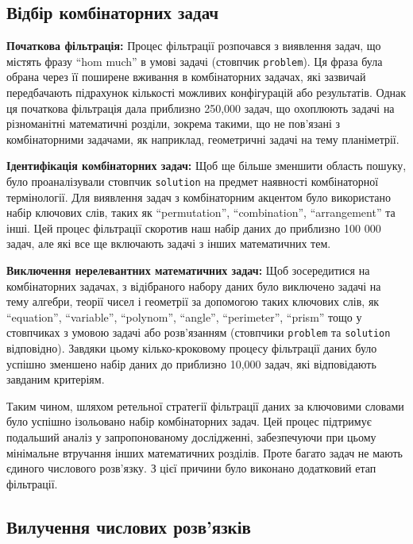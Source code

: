 \subsection{Відбір комбінаторних задач}

\textbf{Початкова фільтрація:} Процес фільтрації розпочався з виявлення задач, що містять фразу ``hom much'' в умові задачі (стовпчик \texttt{problem}). Ця фраза була обрана через її поширене вживання в комбінаторних задачах, які зазвичай передбачають підрахунок кількості можливих конфігурацій або результатів. Однак ця початкова фільтрація дала приблизно 250,000 задач, що охоплюють задачі на різноманітні математичні розділи, зокрема такими, що не пов'язані з комбінаторними задачами, як наприклад, геометричні задачі на тему планіметрії.

\textbf{Ідентифікація комбінаторних задач:} Щоб ще більше зменшити область пошуку, було проаналізували стовпчик \texttt{solution} на предмет наявності комбінаторної термінології. Для виявлення задач з комбінаторним акцентом було використано набір ключових слів, таких як ``permutation'', ``combination'', ``arrangement'' та інші. Цей процес фільтрації скоротив наш набір даних до приблизно 100 000 задач, але які все ще включають задачі з інших математичних тем.

\textbf{Виключення нерелевантних математичних задач:} Щоб зосередитися на комбінаторних задачах, з відібраного набору даних було виключено задачі на тему алгебри, теорії чисел і геометрії за допомогою таких ключових слів, як ``equation'', ``variable'', ``polynom'', ``angle'', ``perimeter'', ``prism'' тощо у стовпчиках з умовою задачі або розв'язанням (стовпчики \texttt{problem} та \texttt{solution} відповідно). Завдяки цьому кілько-кроковому процесу фільтрації даних було успішно зменшено набір даних до приблизно 10,000 задач, які відповідають завданим критеріям.

Таким чином, шляхом ретельної стратегії фільтрації даних за ключовими словами було успішно ізольовано набір комбінаторних задач. Цей процес підтримує подальший аналіз у запропонованому дослідженні, забезпечуючи при цьому мінімальне втручання інших математичних розділів. Проте багато задач не мають єдиного числового розв'язку. З цієї причини було виконано додатковий етап фільтрації.

\subsection{Вилучення числових розв'язків}

